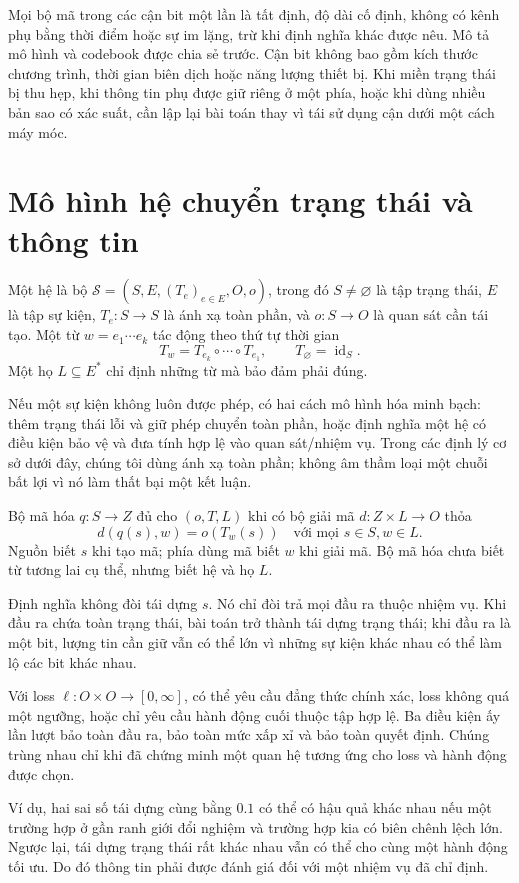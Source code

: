 Mọi bộ mã trong các cận bit một lần là tất định, độ dài cố định, không có kênh phụ bằng thời điểm hoặc sự im lặng, trừ khi định nghĩa khác được nêu. Mô tả mô hình và codebook được chia sẻ trước. Cận bit không bao gồm kích thước chương trình, thời gian biên dịch hoặc năng lượng thiết bị. Khi miền trạng thái bị thu hẹp, khi thông tin phụ được giữ riêng ở một phía, hoặc khi dùng nhiều bản sao có xác suất, cần lập lại bài toán thay vì tái sử dụng cận dưới một cách máy móc.

\section{Mô hình hệ chuyển trạng thái và thông tin}
\begin{definition}\label{def:system}
Một hệ là bộ $\mathcal S=(S,E,(T_e)_{e\in E},O,o)$, trong đó $S\ne\varnothing$ là tập trạng thái, $E$ là tập sự kiện, $T_e:S\to S$ là ánh xạ toàn phần, và $o:S\to O$ là quan sát cần tái tạo. Một từ $w=e_1\cdots e_k$ tác động theo thứ tự thời gian
\[
T_w=T_{e_k}\circ\cdots\circ T_{e_1},\qquad T_{\varnothing}=\operatorname{id}_S.
\]
Một họ $L\subseteq E^*$ chỉ định những từ mà bảo đảm phải đúng.
\end{definition}
Nếu một sự kiện không luôn được phép, có hai cách mô hình hóa minh bạch: thêm trạng thái lỗi và giữ phép chuyển toàn phần, hoặc định nghĩa một hệ có điều kiện bảo vệ và đưa tính hợp lệ vào quan sát/nhiệm vụ. Trong các định lý cơ sở dưới đây, chúng tôi dùng ánh xạ toàn phần; không âm thầm loại một chuỗi bất lợi vì nó làm thất bại một kết luận.

\begin{definition}\label{def:sufficient}
Bộ mã hóa $q:S\to Z$ đủ cho $(o,T,L)$ khi có bộ giải mã $d:Z\times L\to O$ thỏa
\[
d(q(s),w)=o(T_w(s))\quad\text{với mọi }s\in S,w\in L.
\]
Nguồn biết $s$ khi tạo mã; phía dùng mã biết $w$ khi giải mã. Bộ mã hóa chưa biết từ tương lai cụ thể, nhưng biết hệ và họ $L$.
\end{definition}
Định nghĩa không đòi tái dựng $s$. Nó chỉ đòi trả mọi đầu ra thuộc nhiệm vụ. Khi đầu ra chứa toàn trạng thái, bài toán trở thành tái dựng trạng thái; khi đầu ra là một bit, lượng tin cần giữ vẫn có thể lớn vì những sự kiện khác nhau có thể làm lộ các bit khác nhau.

\begin{definition}
Với loss $\ell:O\times O\to[0,\infty]$, có thể yêu cầu đẳng thức chính xác, loss không quá một ngưỡng, hoặc chỉ yêu cầu hành động cuối thuộc tập hợp lệ. Ba điều kiện ấy lần lượt bảo toàn đầu ra, bảo toàn mức xấp xỉ và bảo toàn quyết định. Chúng trùng nhau chỉ khi đã chứng minh một quan hệ tương ứng cho loss và hành động được chọn.
\end{definition}
Ví dụ, hai sai số tái dựng cùng bằng $0.1$ có thể có hậu quả khác nhau nếu một trường hợp ở gần ranh giới đổi nghiệm và trường hợp kia có biên chênh lệch lớn. Ngược lại, tái dựng trạng thái rất khác nhau vẫn có thể cho cùng một hành động tối ưu. Do đó thông tin phải được đánh giá đối với một nhiệm vụ đã chỉ định.
